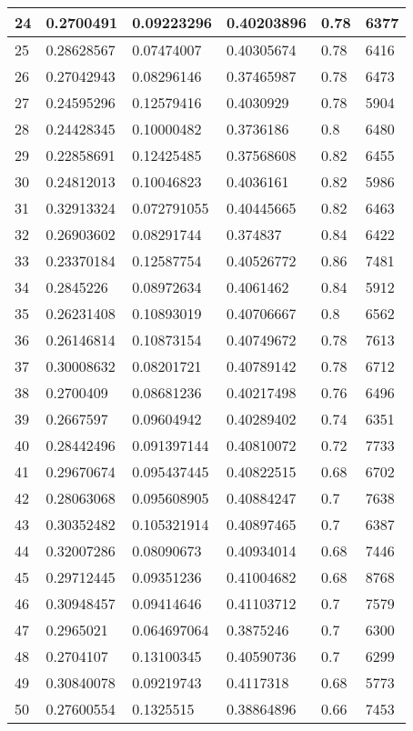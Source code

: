 \begin{longtable}{|l|l|l|l|l|l|}
24 & 0.2700491 & 0.09223296 & 0.40203896 & 0.78 & 6377 \\ \hline 
25 & 0.28628567 & 0.07474007 & 0.40305674 & 0.78 & 6416 \\ \hline 
26 & 0.27042943 & 0.08296146 & 0.37465987 & 0.78 & 6473 \\ \hline 
27 & 0.24595296 & 0.12579416 & 0.4030929 & 0.78 & 5904 \\ \hline 
28 & 0.24428345 & 0.10000482 & 0.3736186 & 0.8 & 6480 \\ \hline 
29 & 0.22858691 & 0.12425485 & 0.37568608 & 0.82 & 6455 \\ \hline 
30 & 0.24812013 & 0.10046823 & 0.4036161 & 0.82 & 5986 \\ \hline 
31 & 0.32913324 & 0.072791055 & 0.40445665 & 0.82 & 6463 \\ \hline 
32 & 0.26903602 & 0.08291744 & 0.374837 & 0.84 & 6422 \\ \hline 
33 & 0.23370184 & 0.12587754 & 0.40526772 & 0.86 & 7481 \\ \hline 
34 & 0.2845226 & 0.08972634 & 0.4061462 & 0.84 & 5912 \\ \hline 
35 & 0.26231408 & 0.10893019 & 0.40706667 & 0.8 & 6562 \\ \hline 
36 & 0.26146814 & 0.10873154 & 0.40749672 & 0.78 & 7613 \\ \hline 
37 & 0.30008632 & 0.08201721 & 0.40789142 & 0.78 & 6712 \\ \hline 
38 & 0.2700409 & 0.08681236 & 0.40217498 & 0.76 & 6496 \\ \hline 
39 & 0.2667597 & 0.09604942 & 0.40289402 & 0.74 & 6351 \\ \hline 
40 & 0.28442496 & 0.091397144 & 0.40810072 & 0.72 & 7733 \\ \hline 
41 & 0.29670674 & 0.095437445 & 0.40822515 & 0.68 & 6702 \\ \hline 
42 & 0.28063068 & 0.095608905 & 0.40884247 & 0.7 & 7638 \\ \hline 
43 & 0.30352482 & 0.105321914 & 0.40897465 & 0.7 & 6387 \\ \hline 
44 & 0.32007286 & 0.08090673 & 0.40934014 & 0.68 & 7446 \\ \hline 
45 & 0.29712445 & 0.09351236 & 0.41004682 & 0.68 & 8768 \\ \hline 
46 & 0.30948457 & 0.09414646 & 0.41103712 & 0.7 & 7579 \\ \hline 
47 & 0.2965021 & 0.064697064 & 0.3875246 & 0.7 & 6300 \\ \hline 
48 & 0.2704107 & 0.13100345 & 0.40590736 & 0.7 & 6299 \\ \hline 
49 & 0.30840078 & 0.09219743 & 0.4117318 & 0.68 & 5773 \\ \hline 
50 & 0.27600554 & 0.1325515 & 0.38864896 & 0.66 & 7453 \\ \hline 
\end{longtable}
